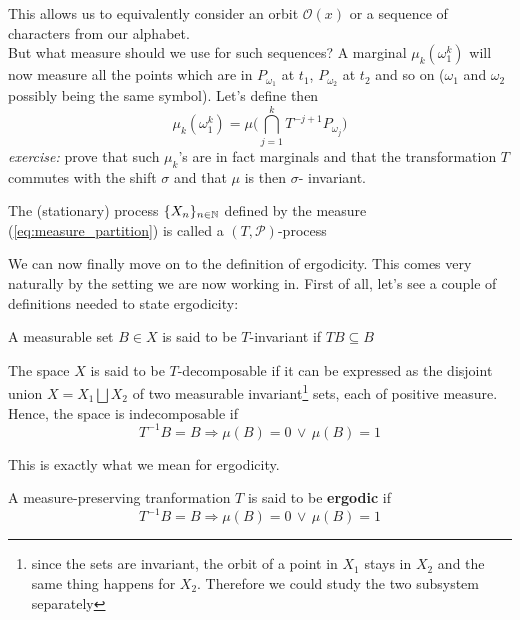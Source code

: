 This allows us to equivalently consider an orbit $\mathcal{O}(x)$ or a sequence of characters from our alphabet. 
\\But what measure should we use for such sequences? A marginal $\mu_k(\omega_1^k)$ will now measure all the points which are in $P_{\omega_1}$ at $t_1$, $P_{\omega_2}$ at $t_2$ and so on ($\omega_1$ and $\omega_2$ possibly being the same symbol). Let's define then
\begin{equation}
\label{eq:measure_partition}
    \mu_k (\omega_1^k) = \mu \big( \bigcap_{j=1}^k T^{-j+1} P_{\omega_j} \big)
\end{equation}
\textit{exercise:} prove that such $\mu_k$'s are in fact marginals and that the transformation $T$ commutes with the shift $\sigma$ and that $\mu$ is then $\sigma$- invariant.
\begin{definition}
    The (stationary) process $\{ X_n \}_{n \in \mathbb{N}}$ defined by the measure (\ref{eq:measure_partition}) is called a $(T, \mathcal{P})$-process
\end{definition}
We can now finally move on to the definition of ergodicity. This comes very naturally by the setting we are now working in. First of all, let's see a couple of definitions needed to state ergodicity:
\begin{definition}
    A measurable set $B \in X$ is said to be $T$-invariant if $TB \subseteq B$
\end{definition}
\begin{definition}
    The space $X$ is said to be $T$-decomposable if it can be expressed as the disjoint union $X = X_1 \bigsqcup X_2$ of two measurable invariant\footnote{since the sets are invariant, the orbit of a point in $X_1$ stays in $X_2$ and the same thing happens for $X_2$. Therefore we could study the two subsystem separately} sets, each of positive measure. Hence, the space is indecomposable if 
    \begin{equation*}
        T^{-1}B = B \Rightarrow \mu(B) = 0 \, \vee \, \mu(B) = 1
    \end{equation*}
\end{definition}
This is exactly what we mean for ergodicity. 
\begin{definition}[Ergodicity]
    A measure-preserving tranformation $T$ is said to be \textbf{ergodic} if
    \begin{equation}
        T^{-1}B = B \Rightarrow \mu(B) = 0 \, \vee \, \mu(B) = 1
    \end{equation}
\end{definition}
